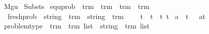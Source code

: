 %
\begin{isabellebody}%
%
%
\isadelimtheory
%
\endisadelimtheory
%
\isatagtheory
{}\isamarkupfalse%
\ Mgu\isanewline
\isanewline
{}\ Substs\isanewline
\isanewline
{}%
\endisatagtheory
{\isafoldtheory}%
%
\isadelimtheory
\isanewline
%
\endisadelimtheory
\isanewline
\isanewline
\isanewline
{}\isamarkupfalse%
\ equ{\isacharunderscore}{\kern0pt}prob\ {\isacharcolon}{\kern0pt}{\isacharcolon}{\kern0pt}\ {\isachardoublequoteopen}trm\ {\isasymRightarrow}\ trm\ {\isasymRightarrow}\ {\isacharparenleft}{\kern0pt}trm\ {\isasymtimes}\ trm{\isacharparenright}{\kern0pt}{\isachardoublequoteclose}\ \ {\isacharparenleft}{\kern0pt}\ {\isachardoublequoteopen}{\isasymapprox}{\isacharquery}{\kern0pt}{\isachardoublequoteclose}\ {}{}{\isacharparenright}{\kern0pt}\isanewline
\ \ fresh{\isacharunderscore}{\kern0pt}prob\ {\isacharcolon}{\kern0pt}{\isacharcolon}{\kern0pt}\ {\isachardoublequoteopen}string\ {\isasymRightarrow}\ trm\ {\isasymRightarrow}\ {\isacharparenleft}{\kern0pt}string\ {\isasymtimes}\ trm{\isacharparenright}{\kern0pt}{\isachardoublequoteclose}\ {\isacharparenleft}{\kern0pt}\ {\isachardoublequoteopen}{\isasymsharp}{\isacharquery}{\kern0pt}{\isachardoublequoteclose}\ {}{}{\isacharparenright}{\kern0pt}\isanewline
{}\isamarkupfalse%
\isanewline
\ {\isachardoublequoteopen}t{}\ {\isasymapprox}{\isacharquery}{\kern0pt}\ t{}{\isachardoublequoteclose}\ {\isasymrightharpoonup}\ {\isachardoublequoteopen}{\isacharparenleft}{\kern0pt}t{}{\isacharcomma}{\kern0pt}\ t{}{\isacharparenright}{\kern0pt}{\isachardoublequoteclose}\isanewline
\ {\isachardoublequoteopen}a\ {\isasymsharp}{\isacharquery}{\kern0pt}\ t{\isachardoublequoteclose}\ \ {\isasymrightharpoonup}\ {\isachardoublequoteopen}{\isacharparenleft}{\kern0pt}a{\isacharcomma}{\kern0pt}t{\isacharparenright}{\kern0pt}{\isachardoublequoteclose}\isanewline
\isanewline
\isanewline
\isanewline
\isanewline
\isanewline
{}\isamarkupfalse%
\ problem{\isacharunderscore}{\kern0pt}type\ {\isacharequal}{\kern0pt}\ {\isachardoublequoteopen}{\isacharparenleft}{\kern0pt}{\isacharparenleft}{\kern0pt}trm\ {\isasymtimes}\ trm{\isacharparenright}{\kern0pt}\ list{\isacharparenright}{\kern0pt}\ {\isasymtimes}\ {\isacharparenleft}{\kern0pt}{\isacharparenleft}{\kern0pt}string\ {\isasymtimes}\ trm{\isacharparenright}{\kern0pt}\ list{\isacharparenright}{\kern0pt}{\isachardoublequoteclose}\isanewline

\end{isabellebody}
